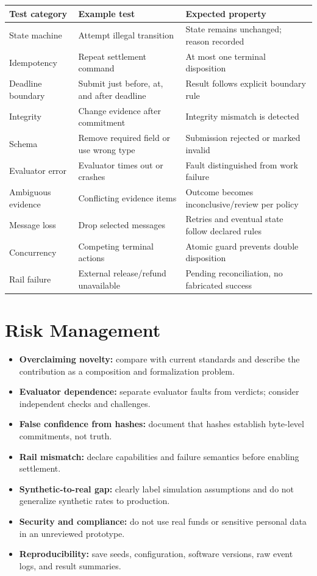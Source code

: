 \documentclass[12pt,a4paper,oneside]{report}
\begin{document}
\begin{longtable}{>{\raggedright\arraybackslash}p{}>{\raggedright\arraybackslash}p{}>{\raggedright\arraybackslash}p{}}
\toprule Test category & Example test & Expected property\\
\midrule
State machine & Attempt illegal transition & State remains unchanged; reason recorded\\
Idempotency & Repeat settlement command & At most one terminal disposition\\
Deadline boundary & Submit just before, at, and after deadline & Result follows explicit boundary rule\\
Integrity & Change evidence after commitment & Integrity mismatch is detected\\
Schema & Remove required field or use wrong type & Submission rejected or marked invalid\\
Evaluator error & Evaluator times out or crashes & Fault distinguished from work failure\\
Ambiguous evidence & Conflicting evidence items & Outcome becomes inconclusive/review per policy\\
Message loss & Drop selected messages & Retries and eventual state follow declared rules\\
Concurrency & Competing terminal actions & Atomic guard prevents double disposition\\
Rail failure & External release/refund unavailable & Pending reconciliation, no fabricated success\\
\bottomrule
\end{longtable}

\section{Risk Management}
\begin{itemize}[leftmargin=*]
\item \textbf{Overclaiming novelty:} compare with current standards and describe the contribution as a composition and formalization problem.
\item \textbf{Evaluator dependence:} separate evaluator faults from verdicts; consider independent checks and challenges.
\item \textbf{False confidence from hashes:} document that hashes establish byte-level commitments, not truth.
\item \textbf{Rail mismatch:} declare capabilities and failure semantics before enabling settlement.
\item \textbf{Synthetic-to-real gap:} clearly label simulation assumptions and do not generalize synthetic rates to production.
\item \textbf{Security and compliance:} do not use real funds or sensitive personal data in an unreviewed prototype.
\item \textbf{Reproducibility:} save seeds, configuration, software versions, raw event logs, and result summaries.
\end{itemize}
\end{document}
